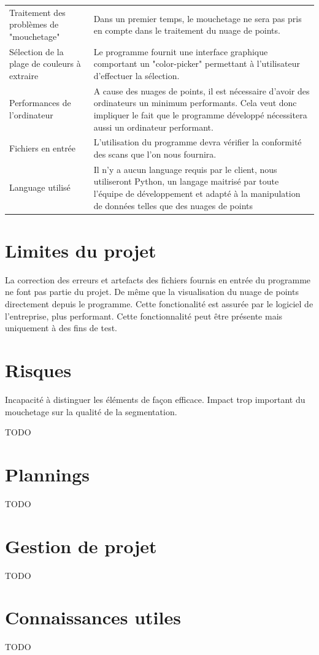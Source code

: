 \documentclass[12pt,titlepage,french]{article}
\begin{document}
\noindent\begin{tabu} to \textwidth {X[c]X[c3]}\toprule
     &\\\toprule
Traitement des problèmes de "mouchetage"
& Dans un premier temps, le mouchetage ne sera pas pris en compte dans le traitement du nuage de points.
\\\midrule
Sélection de la plage de couleurs à extraire 
& Le programme fournit une interface graphique comportant un "color-picker" permettant à l'utilisateur d'effectuer la sélection.\\\midrule
Performances de l'ordinateur
& A cause des nuages de points, il est nécessaire d'avoir des ordinateurs un minimum performants. Cela veut donc impliquer le fait que le programme développé nécessitera aussi un ordinateur performant.\\\midrule
Fichiers en entrée
& L'utilisation du programme devra vérifier la conformité des scans que l'on nous fournira.\\\midrule
Language utilisé
& Il n'y a aucun language requis par le client, nous utiliseront Python, un langage maitrisé par toute l'équipe de développement et adapté à la manipulation de données telles que des nuages de points\\\bottomrule
\end{tabu}

\section{Limites du projet}

La correction des erreurs et artefacts des fichiers fournis en entrée du programme ne font pas partie du projet.
De même que la visualisation du nuage de points directement depuis le programme. Cette fonctionalité est assurée par le logiciel de l'entreprise, plus performant. Cette fonctionnalité peut être présente mais uniquement à des fins de test.
\section{Risques}

Incapacité à distinguer les éléments de façon efficace.
Impact trop important du mouchetage sur la qualité de la segmentation.

TODO

\section{Plannings}

TODO

\section{Gestion de projet}

TODO

\section{Connaissances utiles}

TODO
\end{document}
